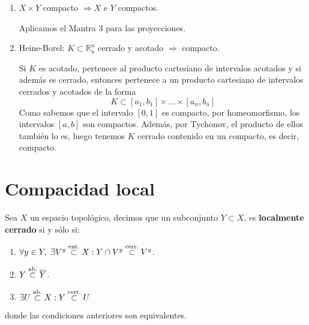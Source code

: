 \begin{obs}
\begin{enumerate}
    \item $X \times Y$ compacto $\Rightarrow X$ e $Y$ compactos.\begin{demo}
        Aplicamos el Mantra $3$ para las proyecciones.
    \end{demo} 
    \item Heine-Borel: $K \subset \mathbb{R}_u^n$ cerrado y acotado $\Rightarrow$ compacto.
    \begin{demo}
    Si $K$ es acotado, pertenece al producto cartesiano de intervalos acotados y si además es cerrado, entonces pertenece a un producto cartesiano de intervalos cerrados y acotados de la forma
    \[
	K \subset \left[ a_1, b_1 \right] \times \ldots \times \left[ a_n, b_n \right]
    \]
    Como sabemos que el intervalo $[0,1]$ es compacto, por homeomorfismo, los intervalos $[a,b]$ son compactos. Además, por Tychonov, el producto de ellos también lo es, luego tenemos $K$ cerrado contenido en un compacto, es decir, compacto.
    \end{demo}
\end{enumerate}
\end{obs}


\chapter{Compacidad local}%
\label{cha:compacidad_local}

\begin{defi}
Sea $X$ un espacio topológico, decimos que un subconjunto $Y \subset X$, es \textbf{localmente cerrado} si y sólo si:
\begin{enumerate}
    \item $\forall y \in Y,\ \exists V^y \stackrel{\text{ent.}}{\subset} X: Y \cap V^y \stackrel{\text{cerr.}}{\subset} V^y$.
    \item $Y \stackrel{\text{ab.}}{\subset} \overline{Y}$.
    \item $\exists U \stackrel{\text{ab.}}{\subset} X : Y \stackrel{\text{cerr.}}{\subset} U$
\end{enumerate}
donde las condiciones anteriores son equivalentes.
\end{defi}


